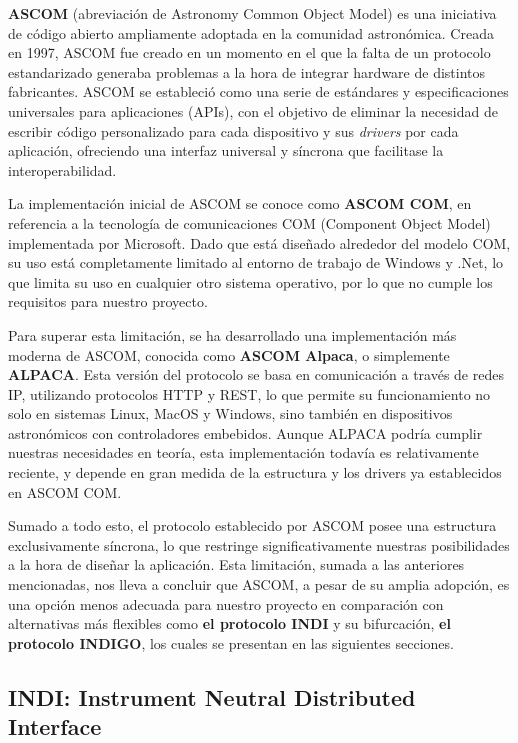 \textbf{ASCOM}\cite{ascom} (abreviación de Astronomy Common Object Model) es una iniciativa de código abierto ampliamente adoptada en la comunidad astronómica. Creada en 1997, ASCOM fue creado en un momento en el que la falta de un protocolo estandarizado generaba problemas a la hora de integrar hardware de distintos fabricantes. ASCOM se estableció como una serie de estándares y especificaciones universales para aplicaciones (APIs), con el objetivo de eliminar la necesidad de escribir código personalizado para cada dispositivo y sus \textit{drivers} por cada aplicación, ofreciendo una interfaz universal y síncrona que facilitase la interoperabilidad.

La implementación inicial de ASCOM se conoce como \textbf{ASCOM COM}\cite{ascom-com}, en referencia a la tecnología de comunicaciones COM (Component Object Model) implementada por Microsoft. Dado que está diseñado alrededor del modelo COM, su uso está completamente limitado al entorno de trabajo de Windows y .Net, lo que limita su uso en cualquier otro sistema operativo, por lo que no cumple los requisitos para nuestro proyecto. 

Para superar esta limitación, se ha desarrollado una implementación más moderna de ASCOM, conocida como \textbf{ASCOM Alpaca}\cite{ascom-alpaca}, o simplemente \textbf{ALPACA}. Esta versión del protocolo se basa en comunicación a través de redes IP, utilizando protocolos HTTP y REST, lo que permite su funcionamiento no solo en sistemas Linux, MacOS y Windows, sino también en dispositivos astronómicos con controladores embebidos. Aunque ALPACA podría cumplir nuestras necesidades en teoría, esta implementación todavía es relativamente reciente, y depende en gran medida de la estructura y los drivers ya establecidos en ASCOM COM.

Sumado a todo esto, el protocolo establecido por ASCOM posee una estructura exclusivamente síncrona, lo que restringe significativamente nuestras posibilidades a la hora de diseñar la aplicación. Esta limitación, sumada a las anteriores mencionadas, nos lleva a concluir que ASCOM, a pesar de su amplia adopción, es una opción menos adecuada para nuestro proyecto en comparación con alternativas más flexibles como \textbf{el protocolo INDI} y su bifurcación, \textbf{el protocolo INDIGO}, los cuales se presentan en las siguientes secciones.


\subsection{INDI: Instrument Neutral Distributed Interface}

